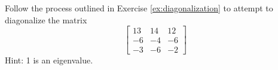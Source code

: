 \documentclass{ximera}
\begin{document}
\begin{exercise}
    Follow the process outlined in Exercise \ref{ex:diagonalization} to attempt to diagonalize the matrix
    \[ \begin{bmatrix} 13 & 14 & 12 \\ -6 & -4 & -6 \\ -3 & -6 & -2 \end{bmatrix}\] Hint: 1 is an eigenvalue. 
\end{exercise}
\end{document}
